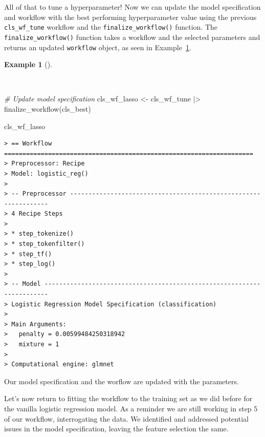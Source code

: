 \documentclass[
  letterpaper,
  DIV=11,
  numbers=noendperiod]{scrreprt}
\newenvironment{Shaded}{\begin{snugshade}}{\end{snugshade}}
\newcommand{\CommentTok}[1]{\textcolor[rgb]{0.00,0.00,0.00}{\textit{#1}}}
\newcommand{\FunctionTok}[1]{\textcolor[rgb]{0.00,0.00,0.00}{#1}}
\newcommand{\NormalTok}[1]{\textcolor[rgb]{0.00,0.00,0.00}{#1}}
\newcommand{\OtherTok}[1]{\textcolor[rgb]{0.00,0.00,0.00}{#1}}
\newcommand{\SpecialCharTok}[1]{\textcolor[rgb]{0.00,0.00,0.00}{#1}}
\theoremstyle{definition}
\newtheorem{example}{Example}[chapter]
\theoremstyle{remark}
\begin{document}
All of that to tune a hyperparameter! Now we can update the model
specification and workflow with the best performing hyperparameter value
using the previous \texttt{cls\_wf\_tune} workflow and the
\texttt{finalize\_workflow()} function. The
\texttt{finalize\_workflow()} function takes a workflow and the selected
parameters and returns an updated \texttt{workflow} object, as seen in
Example~\ref{exm-pda-class-tune-hyperparameters-update-workflow}.

\begin{example}[]\protect\hypertarget{exm-pda-class-tune-hyperparameters-update-workflow}{}\label{exm-pda-class-tune-hyperparameters-update-workflow}

~

\begin{Shaded}
\begin{Highlighting}[]
\CommentTok{\# Update model specification}
\NormalTok{cls\_wf\_lasso }\OtherTok{\textless{}{-}}
\NormalTok{  cls\_wf\_tune }\SpecialCharTok{|\textgreater{}}
  \FunctionTok{finalize\_workflow}\NormalTok{(cls\_best)}

\NormalTok{cls\_wf\_lasso}
\end{Highlighting}
\end{Shaded}

\begin{verbatim}
> == Workflow ====================================================================
> Preprocessor: Recipe
> Model: logistic_reg()
> 
> -- Preprocessor ----------------------------------------------------------------
> 4 Recipe Steps
> 
> * step_tokenize()
> * step_tokenfilter()
> * step_tf()
> * step_log()
> 
> -- Model -----------------------------------------------------------------------
> Logistic Regression Model Specification (classification)
> 
> Main Arguments:
>   penalty = 0.00599484250318942
>   mixture = 1
> 
> Computational engine: glmnet
\end{verbatim}

\end{example}

Our model specification and the worflow are updated with the parameters.

Let's now return to fitting the workflow to the training set as we did
before for the vanilla logistic regression model. As a reminder we are
still working in step 5 of our workflow, interrogating the data. We
identified and addressed potential issues in the model specification,
leaving the feature selection the same.
\end{document}

